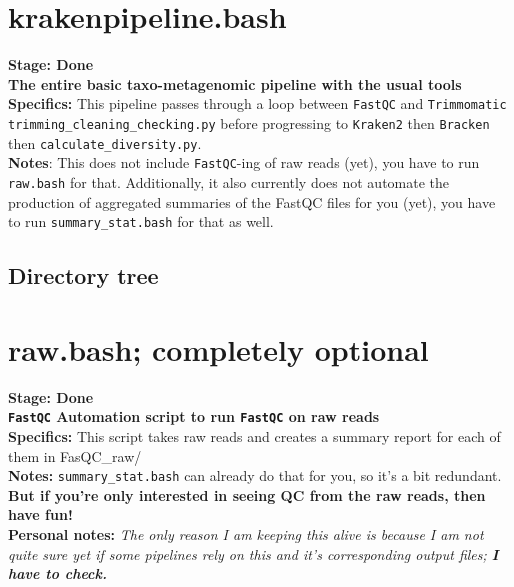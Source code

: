 \documentclass[11pt]{report}
\begin{document}
{\linenumbers*
\section{krakenpipeline.bash}
\textbf{Stage: Done} \\   
\textbf{The entire basic taxo-metagenomic pipeline with the usual tools} \\
\textbf{Specifics:} This pipeline passes through a loop between \texttt{FastQC} and \texttt{Trimmomatic} \texttt{trimming\_cleaning\_checking.py} before progressing to \texttt{Kraken2} then \texttt{Bracken} then \texttt{calculate\_diversity.py}. \\
\textbf{Notes}: This does not include \texttt{FastQC}-ing of raw reads (yet), you have to run \texttt{raw.bash} for that. Additionally, it also currently does not automate the production of aggregated summaries of the FastQC files for you (yet), you have to run \texttt{summary\_stat.bash} for that as well. 

\subsection{Directory tree}

\linenumbers*
\section{raw.bash; completely optional}
\textbf{Stage: Done} \\   
\textbf{\texttt{FastQC} Automation script to run \texttt{FastQC} on raw reads} \\
\textbf{Specifics:} This script takes raw reads and creates a summary report for each of them in  FasQC\_raw/\\
\textbf{Notes:} \texttt{summary\_stat.bash} can already do that for you, so it's a bit redundant. \textbf{But if you're only interested in seeing QC from the raw reads, then have fun!} \\
\textbf{Personal notes:} \textit{The only reason I am keeping this alive is because I am not quite sure yet if some pipelines rely on this and it's corresponding output files; \textbf{I have to check.}}


}
\end{document}
